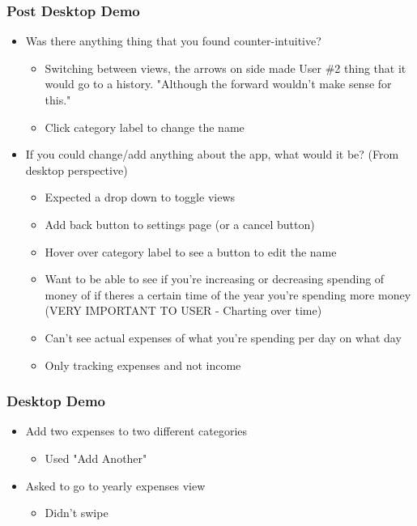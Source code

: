 \documentclass{chi2011}
\begin{document}
	\subsubsection{Post Desktop Demo}
	\begin{itemize}[noitemsep]
		\item Was there anything thing that you found counter-intuitive?
		\begin{itemize}[noitemsep]
			\item Switching between views, the arrows on side made User \#2 thing that it would go to a 
			history. "Although the forward wouldn't make sense for this."
			\item Click category label to change the name
		\end{itemize}
		\item If you could change/add anything about the app, what would it be? (From desktop perspective)
		\begin{itemize}[noitemsep]
			\item Expected a drop down to toggle views
			\item Add back button to settings page (or a cancel button)
			\item Hover over category label to see a button to edit the name
			\item Want to be able to see if you're increasing or decreasing spending of money of if theres a 
			  certain time of the year you're spending more money (VERY IMPORTANT TO USER - Charting
			  over time)
			\item Can't see actual expenses of what you're spending per day on what day
			\item Only tracking expenses and not income
		\end{itemize}
	\end{itemize}
	
	
	\subsubsection{Desktop Demo}
	\begin{itemize}[noitemsep] 
		\item Add two expenses to two different categories
		\begin{itemize}[noitemsep]
			\item Used "Add Another"
		\end{itemize}
	\item Asked to go to yearly expenses view
		\begin{itemize}[noitemsep]
			\item Didn't swipe
		\end{itemize}
	\end{itemize}
\end{document}

